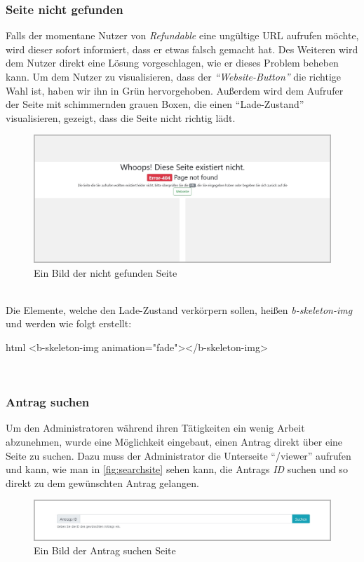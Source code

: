 \subsubsection{Seite nicht gefunden}
\label{chapter:implementierung-frontend-komponenten-notfound}
Falls der momentane Nutzer von \textit{Refundable} eine ungültige URL aufrufen möchte, wird dieser sofort informiert, dass er etwas falsch gemacht hat. Des Weiteren wird dem Nutzer direkt eine Lösung vorgeschlagen, wie er dieses Problem beheben kann. Um dem Nutzer zu visualisieren, dass der \textit{\enquote{Website-Button}} die richtige Wahl ist, haben wir ihn in Grün hervorgehoben. Außerdem wird dem Aufrufer der Seite mit schimmernden grauen Boxen, die einen \enquote{Lade-Zustand} visualisieren, gezeigt, dass die Seite nicht richtig lädt.
\begin{figure}[H]
	\centering
	\includegraphics[width=1\linewidth]{images/ldehner_implementierung/notfound}
	\caption[Nicht gefunden Seite]{Ein Bild der nicht gefunden Seite}
	\label{fig:notfoundsite}
\end{figure}
~\\
Die Elemente, welche den Lade-Zustand verkörpern sollen, heißen \textit{b-skeleton-img} und werden wie folgt erstellt:
\begin{code}{html}
	<b-skeleton-img animation="fade"></b-skeleton-img>
\end{code}
	\label{list:codeskeleton} ~\\

\newpage
\subsubsection{Antrag suchen}
\label{chapter:implementierung-frontend-komponenten-suchen}
Um den Administratoren während ihren Tätigkeiten ein wenig Arbeit abzunehmen, wurde eine Möglichkeit eingebaut, einen Antrag direkt über eine Seite zu suchen. Dazu muss der Administrator die Unterseite \enquote{/viewer} aufrufen und kann, wie man in \autoref{fig:searchsite} sehen kann, die Antrags \textit{ID} suchen und so direkt zu dem gewünschten Antrag gelangen.
\begin{figure}[H]
	\centering
	\includegraphics[width=1\linewidth]{images/ldehner_implementierung/search}
	\caption[Antrag suchen Seite]{Ein Bild der Antrag suchen Seite}
	\label{fig:searchsite}
\end{figure}
~\\

